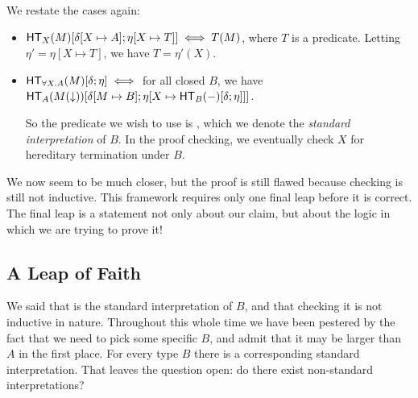 \documentclass{article}
\begin{document}
We restate the cases again:
\begin{itemize}
\item $\mathsf{HT}_{X}(M)[\delta[X\mapsto A];\eta[X\mapsto T]] \iff T(M)$, where $T$ is a predicate.
      Letting $\eta' = \eta[X \mapsto T]$, we have $T = \eta'(X)$.

\item $\mathsf{HT}_{\forall X. A}(M)[\delta;\eta] \iff $ for all closed $B$, we have
      $\mathsf{HT}_{A}(M(\downarrow))[\delta[M \mapsto B];\eta[X \mapsto \mathsf{HT}_{B}(-)[\delta;\eta]]]$.

      So the predicate we wish to use is , which we denote the
      \emph{standard interpretation} of $B$. In the proof checking, we eventually check $X$ for
      hereditary termination under $B$.
\end{itemize}

We now seem to be much closer, but the proof is still flawed because checking 
is still not inductive. This framework requires only one final leap before it is correct. The final
leap is a statement not only about our claim, but about the logic in which we are trying to prove it!

\subsection{A Leap of Faith}

We said that  is the standard interpretation of $B$, and that checking
it is not inductive in nature. Throughout this whole time we have been pestered by the fact that
we need to pick some specific $B$, and admit that it may be larger than $A$ in the first place.
For every type $B$ there is a corresponding standard interpretation.
That leaves the question open: do there exist non-standard interpretations?

\begin{center}
\end{center}
\end{document}
